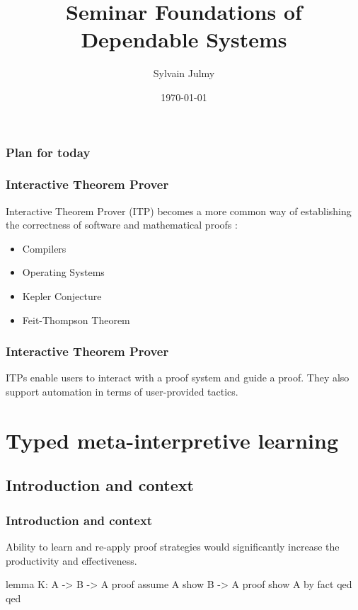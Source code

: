 \documentclass[11pt,handout]{beamer}
\author{Sylvain Julmy}
\title[FDS Seminar]{Seminar Foundations of Dependable Systems}
\date{\today}
\begin{document}
\maketitle


\begin{frame}[allowframebreaks]
  \frametitle{Plan for today}
  {
    \small
    \tableofcontents
  }
\end{frame}

\begin{frame}
  \frametitle{Interactive Theorem Prover}
  Interactive Theorem Prover (ITP) becomes a more common way of establishing the
  correctness of software and mathematical proofs :
  \begin{itemize}
  \item Compilers
  \item Operating Systems
  \item Kepler Conjecture
  \item Feit-Thompson Theorem
  \end{itemize}
\end{frame}

\begin{frame}
  \frametitle{Interactive Theorem Prover}
  ITPs enable users to interact with a proof system and guide a proof. They also
  support automation in terms of user-provided tactics.
\end{frame}

\section[Typed MIL]{Typed meta-interpretive learning}

\subsection[Introduction]{Introduction and context}

\begin{frame}[fragile]
  \frametitle{Introduction and context}
  Ability to learn and re-apply proof strategies would significantly increase
  the  productivity and effectiveness.

  \vspace*{1cm}

  \begin{isabellecode}
    lemma K: A -> B -> A
    proof
      assume A
      show B -> A
      proof
        show A by fact
      qed
    qed
  \end{isabellecode}

\end{frame}
\end{document}
